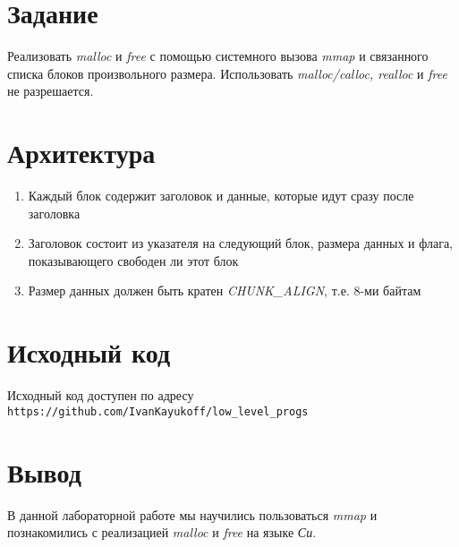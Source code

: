 \documentclass[listings]{labreport}
\begin{document}
\maketitlepage

\section*{Задание}

Реализовать \textit{malloc} и \textit{free} с помощью системного вызова 
\textit{mmap} и связанного списка блоков произвольного размера.
Использовать \textit{malloc/calloc, realloc} и \textit{free} не разрешается.

\section*{Архитектура}

\begin{enumerate}
  \item Каждый блок содержит заголовок и данные, которые идут сразу после
    заголовка
  \item Заголовок состоит из указателя на следующий блок, размера данных и 
    флага, показывающего свободен ли этот блок
  \item Размер данных должен быть кратен \textit{CHUNK\_ALIGN}, т.е. 8-ми байтам
\end{enumerate}

\section*{Исходный код}

Исходный код доступен по адресу 
\texttt{https://github.com/IvanKayukoff/low\_level\_progs}

\section*{Вывод}

В данной лабораторной работе мы научились пользоваться \textit{mmap} и 
познакомились с реализацией \textit{malloc} и \textit{free} на языке \textit{Си}.
\end{document}
